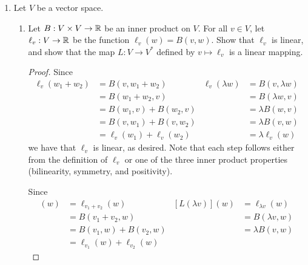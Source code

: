 \documentclass[../psets.tex]{subfiles}
\begin{document}
\begin{enumerate}[label={\textbf{1.2.\roman*.}}]
\begin{enumerate}
\begin{proof}
\begin{equation*}
            \end{equation*}
            Then
            \begin{align*}
                \ell(v_1) &\neq \ell(v_2)\\
                \eva_{v_1}(\ell) &\neq \eva_{v_2}(\ell)\\
                \eva(v_1)(\ell) &\neq \eva(v_2)(\ell)
            \end{align*}
            as desired.
        \end{proof}
    \end{enumerate}
    \setcounter{enumi}{10}
    \item Let $V$ be a vector space.
    \begin{enumerate}
        \item Let $B:V\times V\to\mathbb{R}$ be an inner product on $V$. For all $v\in V$, let $\ell_v:V\to\mathbb{R}$ be the function $\ell_v(w)=B(v,w)$. Show that $\ell_v$ is linear, and show that the map $L:V\to V^*$ defined by $v\mapsto\ell_v$ is a linear mapping.
        \begin{proof}
            Since
            \begin{align*}
                \ell_v(w_1+w_2) &= B(v,w_1+w_2)&
                    \ell_v(\lambda w) &= B(v,\lambda w)\\
                &= B(w_1+w_2,v)&
                    &= B(\lambda w,v)\\
                &= B(w_1,v)+B(w_2,v)&
                    &= \lambda B(w,v)\\
                &= B(v,w_1)+B(v,w_2)&
                    &= \lambda B(v,w)\\
                &= \ell_v(w_1)+\ell_v(w_2)&
                    &= \lambda\ell_v(w)
            \end{align*}
            we have that $\ell_v$ is linear, as desired. Note that each step follows either from the definition of $\ell_v$ or one of the three inner product properties (bilinearity, symmetry, and positivity).\par
            Since
            \begin{align*}
                [L(v_1+v_2)](w) &= \ell_{v_1+v_2}(w)&
                    [L(\lambda v)](w) &= \ell_{\lambda v}(w)\\
                &= B(v_1+v_2,w)&
                    &= B(\lambda v,w)\\
                &= B(v_1,w)+B(v_2,w)&
                    &= \lambda B(v,w)\\
                &= \ell_{v_1}(w)+\ell_{v_2}(w)&

\end{align*}
\end{proof}
\end{enumerate}
\end{enumerate}
\end{document}
